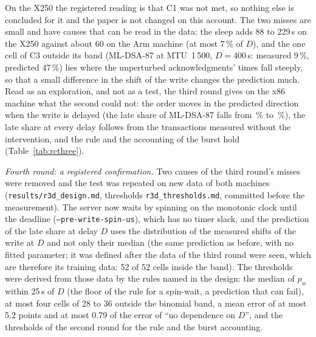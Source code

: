 \documentclass[9pt]{article}
\begin{document}
On the X250 the registered reading is that C1 was not met, so nothing else is concluded for it and the paper is not changed on this account. The two misses are small and have causes that can be read in the data: the sleep adds 88 to 229\,\textmu s on the X250 against about 60 on the Arm machine (at most 7\,\% of $D$), and the one cell of C3 outside its band (ML-DSA-87 at MTU~1\,500, $D=400$\,\textmu s: measured 9\,\%, predicted 47\,\%) lies where the unperturbed acknowledgments' times fall steeply, so that a small difference in the shift of the write changes the prediction much. Read as an exploration, and not as a test, the third round gives on the x86 machine what the second could not: the order moves in the predicted direction when the write is delayed (the late share of ML-DSA-87 falls from \RcTestLateZero\,\% to \RcTestLateMax\,\%), the late share at every delay follows from the transactions measured without the intervention, and the rule and the accounting of the burst hold (Table~\ref{tab:rcthree}).

\emph{Fourth round: a registered confirmation.} Two causes of the third round's misses were removed and the test was repeated on new data of both machines (\texttt{results/r3d\_design.md}, thresholds \texttt{r3d\_thresholds.md}, committed before the measurement). The server now waits by spinning on the monotonic clock until the deadline (\texttt{--pre-write-spin-us}), which has no timer slack, and the prediction of the late share at delay $D$ uses the distribution of the measured shifts of the write at $D$ and not only their median (the same prediction as before, with no fitted parameter; it was defined after the data of the third round were seen, which are therefore its training data: 52 of 52 cells inside the band). The thresholds were derived from those data by the rules named in the design: the median of $p_w$ within 25\,\textmu s of $D$ (the floor of the rule for a spin-wait, a prediction that can fail), at most four cells of 28 to 36 outside the binomial band, a mean error of at most 5.2 points and at most 0.79 of the error of ``no dependence on $D$'', and the thresholds of the second round for the rule and the burst accounting.
\end{document}
